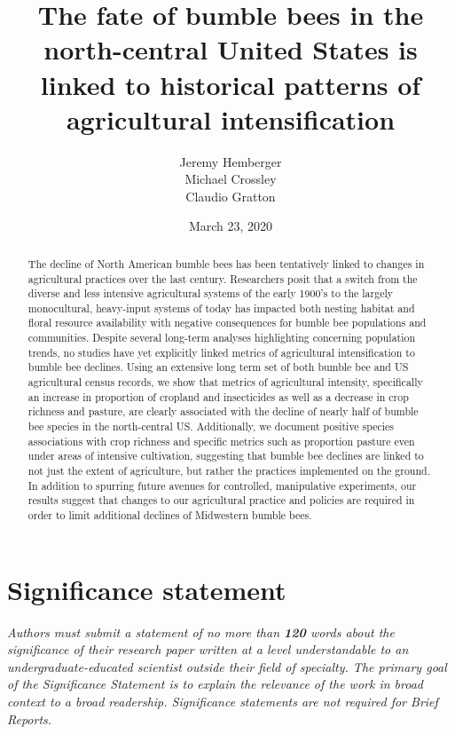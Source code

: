 \documentclass[11pt,]{article}
\title{\textbf{The fate of bumble bees in the north-central United States is
linked to historical patterns of agricultural intensification}}
\author{Jeremy Hemberger \\ Michael Crossley \\ Claudio Gratton}
\date{March 23, 2020}
\begin{document}
\maketitle
\begin{abstract}
The decline of North American bumble bees has been tentatively linked to
changes in agricultural practices over the last century. Researchers
posit that a switch from the diverse and less intensive agricultural
systems of the early 1900's to the largely monocultural, heavy-input
systems of today has impacted both nesting habitat and floral resource
availability with negative consequences for bumble bee populations and
communities. Despite several long-term analyses highlighting concerning
population trends, no studies have yet explicitly linked metrics of
agricultural intensification to bumble bee declines. Using an extensive
long term set of both bumble bee and US agricultural census records, we
show that metrics of agricultural intensity, specifically an increase in
proportion of cropland and insecticides as well as a decrease in crop
richness and pasture, are clearly associated with the decline of nearly
half of bumble bee species in the north-central US. Additionally, we
document positive species associations with crop richness and specific
metrics such as proportion pasture even under areas of intensive
cultivation, suggesting that bumble bee declines are linked to not just
the extent of agriculture, but rather the practices implemented on the
ground. In addition to spurring future avenues for controlled,
manipulative experiments, our results suggest that changes to our
agricultural practice and policies are required in order to limit
additional declines of Midwestern bumble bees.
\end{abstract}

\captionsetup[table]{labelformat=empty}

\hypertarget{significance-statement}{%
\section{Significance statement}\label{significance-statement}}

\emph{Authors must submit a statement of no more than \textbf{120} words
about the significance of their research paper written at a level
understandable to an undergraduate-educated scientist outside their
field of specialty. The primary goal of the Significance Statement is to
explain the relevance of the work in broad context to a broad
readership. Significance statements are not required for Brief Reports.}
\end{document}
